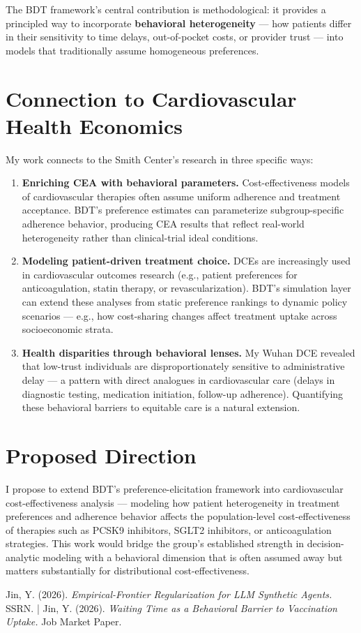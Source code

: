 \documentclass[11pt,a4paper]{article}
\begin{document}
The BDT framework's central contribution is methodological: it provides a principled way to incorporate \textbf{behavioral heterogeneity} --- how patients differ in their sensitivity to time delays, out-of-pocket costs, or provider trust --- into models that traditionally assume homogeneous preferences.

\section*{Connection to Cardiovascular Health Economics}

My work connects to the Smith Center's research in three specific ways:

\begin{enumerate}[leftmargin=*, nosep]
    \item \textbf{Enriching CEA with behavioral parameters.} Cost-effectiveness models of cardiovascular therapies often assume uniform adherence and treatment acceptance. BDT's preference estimates can parameterize subgroup-specific adherence behavior, producing CEA results that reflect real-world heterogeneity rather than clinical-trial ideal conditions.
    \item \textbf{Modeling patient-driven treatment choice.} DCEs are increasingly used in cardiovascular outcomes research (e.g., patient preferences for anticoagulation, statin therapy, or revascularization). BDT's simulation layer can extend these analyses from static preference rankings to dynamic policy scenarios --- e.g., how cost-sharing changes affect treatment uptake across socioeconomic strata.
    \item \textbf{Health disparities through behavioral lenses.} My Wuhan DCE revealed that low-trust individuals are disproportionately sensitive to administrative delay --- a pattern with direct analogues in cardiovascular care (delays in diagnostic testing, medication initiation, follow-up adherence). Quantifying these behavioral barriers to equitable care is a natural extension.
\end{enumerate}

\section*{Proposed Direction}

I propose to extend BDT's preference-elicitation framework into cardiovascular cost-effectiveness analysis --- modeling how patient heterogeneity in treatment preferences and adherence behavior affects the population-level cost-effectiveness of therapies such as PCSK9 inhibitors, SGLT2 inhibitors, or anticoagulation strategies. This work would bridge the group's established strength in decision-analytic modeling with a behavioral dimension that is often assumed away but matters substantially for distributional cost-effectiveness.

\vfill
{} {\small Jin, Y. (2026). \emph{Empirical-Frontier Regularization for LLM Synthetic Agents.} SSRN. \;|\; Jin, Y. (2026). \emph{Waiting Time as a Behavioral Barrier to Vaccination Uptake.} Job Market Paper.}
\end{document}
